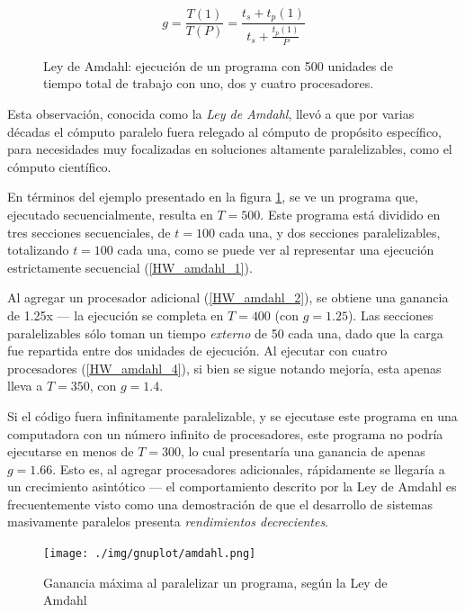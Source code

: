 \documentclass[11pt,fleqn]{book} %
\begin{document}
$$g = \frac{T(1)}{T(P)} = \frac{t_s + t_p(1)}{t_s + \frac{t_p(1)}{P}}$$

\begin{figure}
\centering
{}
\hfill
{}
\hfill
{}
\caption {Ley de Amdahl: ejecución de un programa con 500 unidades de tiempo total de trabajo con uno, dos y cuatro procesadores.}
\label{HW_amdahl}
\end{figure}


Esta observación, conocida como la \emph{Ley de Amdahl}, llevó a que por
varias décadas el cómputo paralelo fuera relegado al cómputo de
propósito específico, para necesidades muy focalizadas en soluciones
altamente paralelizables, como el cómputo científico.

En términos del ejemplo presentado en la figura \ref{HW_amdahl}, se ve
un programa que, ejecutado secuencialmente, resulta en $T=500$. Este
programa está dividido en tres secciones secuenciales, de $t=100$ cada
una, y dos secciones paralelizables, totalizando $t=100$ cada una,
como se puede ver al representar una ejecución estrictamente
secuencial (\ref{HW_amdahl_1}).

Al agregar un procesador adicional (\ref{HW_amdahl_2}), se obtiene una
ganancia de 1.25x — la ejecución se completa en $T=400$ (con
$g=1.25$). Las secciones paralelizables sólo toman un tiempo \emph{externo}
de 50 cada una, dado que la carga fue repartida entre dos unidades de
ejecución. Al ejecutar con cuatro procesadores (\ref{HW_amdahl_4}), si
bien se sigue notando mejoría, esta apenas lleva a $T=350$,
con $g=1.4$.

Si el código fuera infinitamente paralelizable, y se ejecutase este
programa en una computadora con un número infinito de procesadores,
este programa no podría ejecutarse en menos de $T=300$, lo cual 
presentaría una ganancia de apenas $g=1.66$. Esto es, al agregar
procesadores adicionales, rápidamente se llegaría a un crecimiento
asintótico — el comportamiento descrito por la Ley de Amdahl es
frecuentemente visto como una demostración de que el desarrollo de
sistemas masivamente paralelos presenta \emph{rendimientos decrecientes}.

\begin{figure}[htb]
\centering
\texttt{[image: ./img/gnuplot/amdahl.png]}
\caption{\label{HW_amdahl_porcentajes}Ganancia máxima al paralelizar un programa, según la Ley de Amdahl}
\end{figure}
\end{document}
